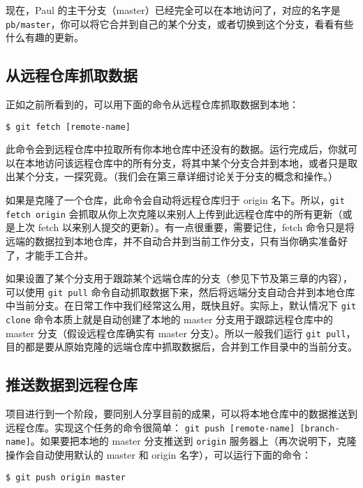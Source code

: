 \documentclass[a4paper]{book}
\begin{document}
现在，Paul 的主干分支（master）已经完全可以在本地访问了，对应的名字是 \texttt{pb/master}，你可以将它合并到自己的某个分支，或者切换到这个分支，看看有些什么有趣的更新。

\subsection{从远程仓库抓取数据}

正如之前所看到的，可以用下面的命令从远程仓库抓取数据到本地：

\begin{shaded}\begin{verbatim}
$ git fetch [remote-name]
\end{verbatim}\end{shaded}

此命令会到远程仓库中拉取所有你本地仓库中还没有的数据。运行完成后，你就可以在本地访问该远程仓库中的所有分支，将其中某个分支合并到本地，或者只是取出某个分支，一探究竟。（我们会在第三章详细讨论关于分支的概念和操作。）

如果是克隆了一个仓库，此命令会自动将远程仓库归于 origin 名下。所以，\texttt{git fetch origin} 会抓取从你上次克隆以来别人上传到此远程仓库中的所有更新（或是上次 fetch 以来别人提交的更新）。有一点很重要，需要记住，fetch 命令只是将远端的数据拉到本地仓库，并不自动合并到当前工作分支，只有当你确实准备好了，才能手工合并。

如果设置了某个分支用于跟踪某个远端仓库的分支（参见下节及第三章的内容），可以使用 \texttt{git pull} 命令自动抓取数据下来，然后将远端分支自动合并到本地仓库中当前分支。在日常工作中我们经常这么用，既快且好。实际上，默认情况下 \texttt{git clone} 命令本质上就是自动创建了本地的 master 分支用于跟踪远程仓库中的 master 分支（假设远程仓库确实有 master 分支）。所以一般我们运行 \texttt{git pull}，目的都是要从原始克隆的远端仓库中抓取数据后，合并到工作目录中的当前分支。

\subsection{推送数据到远程仓库}

项目进行到一个阶段，要同别人分享目前的成果，可以将本地仓库中的数据推送到远程仓库。实现这个任务的命令很简单： \texttt{git push {[}remote-name{]} {[}branch-name{]}}。如果要把本地的 master 分支推送到 \texttt{origin} 服务器上（再次说明下，克隆操作会自动使用默认的 master 和 origin 名字），可以运行下面的命令：

\begin{shaded}\begin{verbatim}
$ git push origin master
\end{verbatim}\end{shaded}
\end{document}
